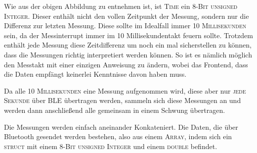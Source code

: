 Wie aus der obigen Abbildung zu entnehmen ist, ist \textsc{Time} ein \textsc{8-Bit unsigned Integer}. Dieser enthält nicht den vollen Zeitpunkt der Messung, sondern nur die Differenz zur letzten Messung. Diese sollte im Idealfall immer \textsc{10 Millisekunden} sein, da der Messinterrupt immer im 10 Millisekundentakt feuern sollte. Trotzdem enthält jede Messung diese Zeitdifferenz um noch ein mal sicherstellen zu können, dass die Messungen richtig interpretiert werden können. So ist es nämlich möglich den Messtakt mit einer einzigen Anweisung zu ändern, wobei das Frontend, dass die Daten empfängt keinerlei Kenntnisse davon haben muss.

Da alle \textsc{10 Millisekunden} eine Messung aufgenommen wird, diese aber nur \textsc{jede Sekunde} über \ac{BLE} übertragen werden, sammeln sich diese Messungen an und werden dann anschließend alle gemeinsam in einem Schwung übertragen.

\begin{figure}[htb]
    \centering
\end{figure}

Die Messungen werden einfach aneinander Konkateniert. Die Daten, die über Bluetooth gesendet werden bestehen, also aus einem \textsc{Array}, indem sich ein \textsc{struct} mit einem \textsc{8-Bit unsigned Integer} und einem \textsc{double} befindet.